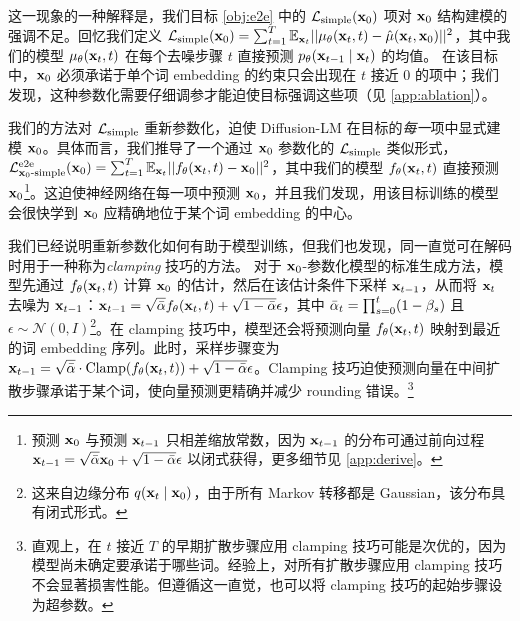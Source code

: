 这一现象的一种解释是，我们目标 \ref{obj:e2e} 中的 $\mathcal{L}_\text{simple}(\mathbf{x}_{0})$ 项对 $\mathbf{x}_{0}$ 结构建模的强调不足。回忆我们定义 $\mathcal{L}_\text{simple}(\mathbf{x}_{0}) =\sum_{t=1}^T \mathbb{E}_{\mathbf{x}_{t}}|| \mu_\theta(\mathbf{x}_{t}, t) - \hat{\mu}(\mathbf{x}_{t}, \mathbf{x}_{0}) ||^2$，其中我们的模型 $\mu_\theta(\mathbf{x}_{t}, t)$ 在每个去噪步骤 $t$ 直接预测 $p_\theta(\mathbf{x}_{t-1}\mid \mathbf{x}_{t})$ 的均值。
在该目标中，$\mathbf{x}_{0}$ 必须承诺于单个词 embedding 的约束只会出现在 $t$ 接近 $0$ 的项中；我们发现，这种参数化需要仔细调参才能迫使目标强调这些项（见 \cref{app:ablation}）。


\newcommand{\Lsimplexx}{\mathcal{L}^\text{e2e}_{\cx{0}\text{-simple}}}
我们的方法对 $\mathcal{L}_\text{simple}$ 重新参数化，迫使 Diffusion-LM 在目标的\emph{每一}项中显式建模 $\mathbf{x}_{0}$。具体而言，我们推导了一个通过 $\mathbf{x}_{0}$ 参数化的 $\mathcal{L}_\text{simple}$ 类似形式，
$\Lsimplexx(\cx{0})=\sum_{t=1}^T \mathbb{E}_{\cx{t}} ||\xxtheta(\cx{t}, t) - \cx{0} ||^2$，其中我们的模型 $f_\theta(\mathbf{x}_{t}, t)$ 直接预测 $\mathbf{x}_{0}$\footnote{预测 $\mathbf{x}_{0}$ 与预测 $\mathbf{x}_{t-1}$ 只相差缩放常数，因为 $\mathbf{x}_{t-1}$ 的分布可通过前向过程 $\mathbf{x}_{t-1} = \sqrt{\bar{\alpha}} \mathbf{x}_{0} +\sqrt{1-\bar{\alpha}} \epsilon$ 以闭式获得，更多细节见 \cref{app:derive}。}。这迫使神经网络在每一项中预测 $\mathbf{x}_{0}$，并且我们发现，用该目标训练的模型会很快学到 $\mathbf{x}_{0}$ 应精确地位于某个词 embedding 的中心。

我们已经说明重新参数化如何有助于模型训练，但我们也发现，同一直觉可在解码时用于一种称为\emph{clamping} 技巧的方法。
对于 $\mathbf{x}_{0}$-参数化模型的标准生成方法，模型先通过 $f_\theta(\mathbf{x}_{t}, t)$ 计算 $\mathbf{x}_{0}$ 的估计，然后在该估计条件下采样 $\mathbf{x}_{t-1}$，从而将 $\mathbf{x}_{t}$ 去噪为 $\mathbf{x}_{t-1}$：$\mathbf{x}_{t-1} = \sqrt{\bar{\alpha}} f_\theta(\mathbf{x}_{t}, t) +\sqrt{1-\bar{\alpha}} \epsilon$，其中 $\bar{\alpha}_t = \prod_{s=0}^t (1-\beta_s)$ 且 $\epsilon \sim \mathcal{N}(0,I)$\footnote{这来自边缘分布 $q(\mathbf{x}_{t} \mid \mathbf{x}_{0})$，由于所有 Markov 转移都是 Gaussian，该分布具有闭式形式。}。在 clamping 技巧中，模型还会将预测向量 $f_\theta(\mathbf{x}_{t}, t)$ 映射到最近的词 embedding 序列。此时，采样步骤变为 $\mathbf{x}_{t-1} = \sqrt{\bar{\alpha}}\cdot \operatorname{Clamp}(f_\theta(\mathbf{x}_{t}, t)) +\sqrt{1-\bar{\alpha}} \epsilon$。Clamping 技巧迫使预测向量在中间扩散步骤承诺于某个词，使向量预测更精确并减少 rounding 错误。\footnote{直观上，在 $t$ 接近 $T$ 的早期扩散步骤应用 clamping 技巧可能是次优的，因为模型尚未确定要承诺于哪些词。经验上，对所有扩散步骤应用 clamping 技巧不会显著损害性能。但遵循这一直觉，也可以将 clamping 技巧的起始步骤设为超参数。}
















